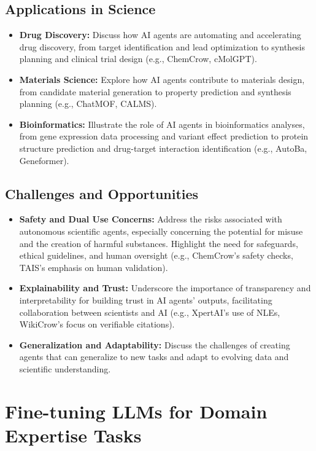 \documentclass{article}
\begin{document}
\subsection{Applications in Science}
\begin{itemize}
    \item \textbf{Drug Discovery:} Discuss how AI agents are automating and accelerating drug discovery, from target identification and lead optimization to synthesis planning and clinical trial design (e.g., ChemCrow, cMolGPT).
    \item \textbf{Materials Science:} Explore how AI agents contribute to materials design, from candidate material generation to property prediction and synthesis planning (e.g., ChatMOF, CALMS).
    \item \textbf{Bioinformatics:} Illustrate the role of AI agents in bioinformatics analyses, from gene expression data processing and variant effect prediction to protein structure prediction and drug-target interaction identification (e.g., AutoBa, Geneformer).
\end{itemize}

\subsection{Challenges and Opportunities}
\begin{itemize}
    \item \textbf{Safety and Dual Use Concerns:} Address the risks associated with autonomous scientific agents, especially concerning the potential for misuse and the creation of harmful substances. Highlight the need for safeguards, ethical guidelines, and human oversight (e.g., ChemCrow's safety checks, TAIS's emphasis on human validation).
    \item \textbf{Explainability and Trust:} Underscore the importance of transparency and interpretability for building trust in AI agents' outputs, facilitating collaboration between scientists and AI (e.g., XpertAI's use of NLEs, WikiCrow's focus on verifiable citations).
    \item \textbf{Generalization and Adaptability:} Discuss the challenges of creating agents that can generalize to new tasks and adapt to evolving data and scientific understanding.
\end{itemize}

\section{Fine-tuning LLMs for Domain Expertise Tasks}
\end{document}
